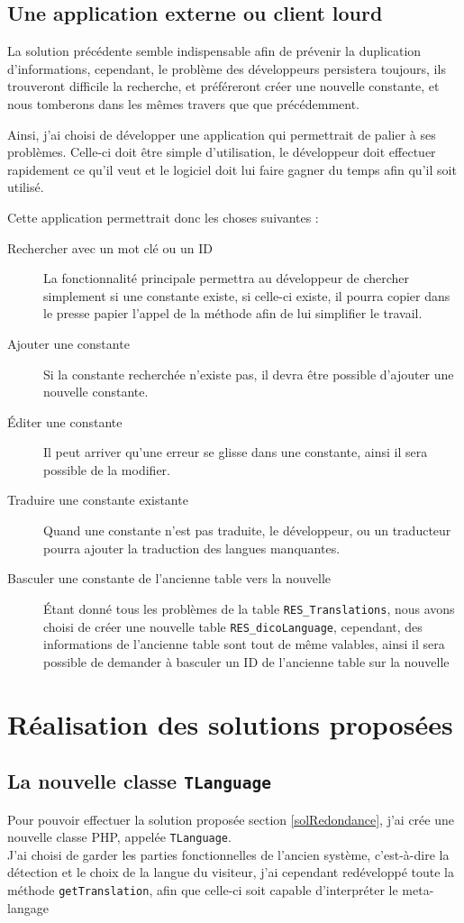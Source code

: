 	\subsection{Une application externe ou client lourd} \label{mlanguage}
	La solution précédente semble indispensable afin de prévenir la duplication d'informations, cependant, le problème des développeurs persistera toujours, ils trouveront difficile la recherche, et préféreront créer une nouvelle constante, et nous tomberons dans les mêmes travers que que précédemment.
	
	Ainsi, j'ai choisi de développer une application qui permettrait de palier à ses problèmes. Celle-ci doit être simple d'utilisation, le développeur doit effectuer rapidement ce qu'il veut et le logiciel doit lui faire gagner du temps afin qu'il soit utilisé.

	Cette application permettrait donc les choses suivantes :
	\begin{description}
		\item[Rechercher avec un mot clé ou un ID]  La fonctionnalité principale permettra au développeur de chercher simplement si une constante existe, si celle-ci existe, il pourra copier dans le presse papier l'appel de la méthode afin de lui simplifier
			le travail.
		\item[Ajouter une constante] Si la constante recherchée n'existe pas, il devra être possible d'ajouter une nouvelle constante.
		\item[\'Editer une constante] Il peut arriver qu'une erreur se glisse dans une constante, ainsi il sera possible de la modifier.
		\item[Traduire une constante existante] Quand une constante n'est pas traduite, le développeur, ou un traducteur pourra ajouter la traduction des langues manquantes.
		\item[Basculer une constante de l'ancienne table vers la nouvelle] Étant donné tous les problèmes de la table \texttt{RES\_Translations}, nous avons choisi de créer une nouvelle table \texttt{RES\_dicoLanguage}, cependant, des informations de l'ancienne table sont tout de même
			valables, ainsi il sera possible de demander à basculer un ID de l'ancienne table sur la nouvelle
	\end{description}

	\section{Réalisation des solutions proposées}
		\subsection{La nouvelle classe \texttt{TLanguage}}
		Pour pouvoir effectuer la solution proposée section \ref{solRedondance}, j'ai crée une nouvelle classe PHP, appelée \texttt{TLanguage}. \\
			J'ai choisi de garder les parties fonctionnelles de l'ancien système, c'est-à-dire la détection et le choix de la langue du visiteur, j'ai cependant redéveloppé toute la méthode \texttt{getTranslation}, afin que celle-ci soit capable d'interpréter le meta-langage
